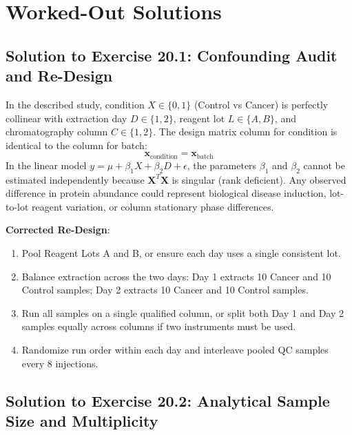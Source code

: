 \documentclass[11pt,twoside,openright]{book}
\begin{document}
\section{Worked-Out Solutions}

\subsection{Solution to Exercise 20.1: Confounding Audit and Re-Design}

In the described study, condition $X \in \{0, 1\}$ (Control vs Cancer) is perfectly collinear with extraction day $D \in \{1, 2\}$, reagent lot $L \in \{A, B\}$, and chromatography column $C \in \{1, 2\}$. The design matrix column for condition is identical to the column for batch:
\begin{equation}
\mathbf{x}_{\text{condition}} = \mathbf{x}_{\text{batch}}
\end{equation}
In the linear model $y = \mu + \beta_1 X + \beta_2 D + \epsilon$, the parameters $\beta_1$ and $\beta_2$ cannot be estimated independently because $\mathbf{X}^T \mathbf{X}$ is singular (rank deficient). Any observed difference in protein abundance could represent biological disease induction, lot-to-lot reagent variation, or column stationary phase differences.

\noindent
\textbf{Corrected Re-Design}:
\begin{enumerate}
    \item Pool Reagent Lots A and B, or ensure each day uses a single consistent lot.
    \item Balance extraction across the two days: Day 1 extracts 10 Cancer and 10 Control samples; Day 2 extracts 10 Cancer and 10 Control samples.
    \item Run all samples on a single qualified column, or split both Day 1 and Day 2 samples equally across columns if two instruments must be used.
    \item Randomize run order within each day and interleave pooled QC samples every 8 injections.
\end{enumerate}

\subsection{Solution to Exercise 20.2: Analytical Sample Size and Multiplicity}
\end{document}
